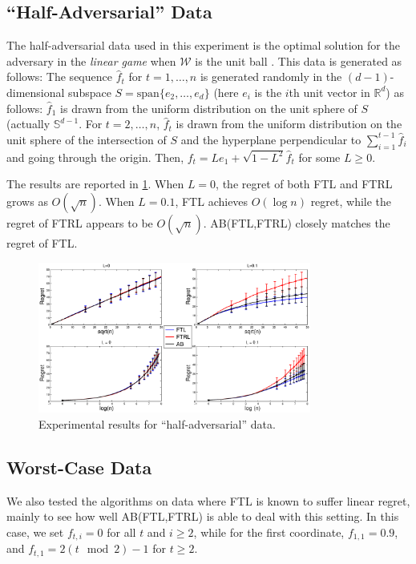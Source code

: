 \documentclass[english]{article}
\newcommand{\cW}{\mathcal{W}}
\newcommand{\R}{\mathbb{R}}
\newcommand{\bS}{\mathbb{S}}
\begin{document}
\subsection{``Half-Adversarial'' Data}
The half-adversarial data used in this experiment is the optimal solution for the adversary 
in the \emph{linear game} when $\cW$ is the unit ball \citep{abernethy2008optimal}. 
This data is generated as follows:
The sequence $\hat{f}_t$ for $t = 1, \ldots, n$ is generated randomly
in the $(d-1)$-dimensional subspace $S = \text{span}\{e_2, \ldots, e_d\}$ (here $e_i$ is the $i$th unit vector in $\R^d$) as follows:
$\hat{f}_1$ is drawn from the uniform distribution on the unit sphere of $S$ (actually $\bS^{d-1}$. 
For $t = 2, \ldots, n$, $\hat{f}_t$ is drawn from the uniform distribution on the unit sphere
of the intersection of $S$ and the hyperplane perpendicular to $\sum_{i=1}^{t-1} \hat{f}_i$ and going through the origin.
Then, $f_t = Le_1 + \sqrt{1-L^2} \hat{f}_t$ for some $L \ge 0$.

The results are reported in \cref{res:adver}.
When $L=0$,  the regret of both FTL and FTRL grows as $O(\sqrt{n})$. 
When $L=0.1$, FTL achieves $O(\log n)$ regret,
while the regret of FTRL appears to be $O(\sqrt{n})$. 
AB(FTL,FTRL) closely matches the regret of FTL.

\begin{figure}[th]
	\centering
	\includegraphics[width=0.8\textwidth]{figures/ExpResults/Adve}
	\caption{Experimental results for ``half-adversarial'' data. \label{res:adver}}
\end{figure}


\subsection{Worst-Case Data}
We also tested the algorithms on data where FTL is known to suffer linear regret, mainly to see how well AB(FTL,FTRL) is able to deal with this setting.
In this case, we set $f_{t,i}=0$ for all $t$ and $i\ge 2$, while 
for the first coordinate, $f_{1,1} = 0.9$, and $f_{t,1} = 2(t \mod 2) - 1$ for $t \ge 2$.
\end{document}
